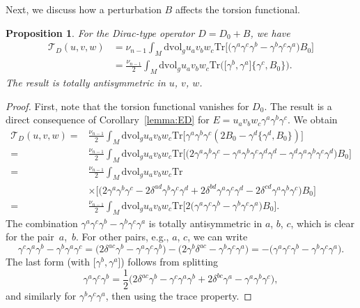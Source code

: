 \documentclass[10pt,a4paper]{amsart}
\numberwithin{equation}{section}
\newtheorem{Proposition}[Theorem]{Proposition}
\theoremstyle{definition}
\def\Tr{\mathrm{Tr}}
\def\dv{\mathrm{dvol}_g}
\begin{document}
Next, we discuss how a perturbation $B$ affects the torsion functional.
\begin{Proposition}\label{prop:ogolna_torsja}
	For the Dirac-type operator $D=D_0+B$, we have
	\begin{align*}
			\mathscr{T}_D(u,v,w)&=
			\nu_{n-1}\int_M \dv u_av_bw_c\Tr\bigl[\bigl(\gamma^a\gamma^c\gamma^b-\gamma^b\gamma^c\gamma^a\bigr)B_0\bigr]\\
			&=\frac{\nu_{n-1}}{2}\int_M \dv u_av_bw_c\Tr\bigl(\bigl[\gamma^b,\gamma^a\bigr]\{\gamma^c,B_0\}\bigr).
		\end{align*}
	The result is totally antisymmetric in $u$, $v$, $w$.
\end{Proposition}
\begin{proof}
	First, note that the torsion functional vanishes for $D_0$. The result is a direct consequence of Corollary~\ref{lemma:ED} for $E=u_av_bw_c\gamma^a\gamma^b\gamma^c$. We obtain
		\begin{align*}
			\mathscr{T}_D(u,v,w)={}&\frac{\nu_{n-1}}{2}\int_M \dv u_av_bw_c\Tr\bigl[\gamma^a\gamma^b\gamma^c(2B_0-\gamma^d\bigl\{\gamma^d,B_0\bigr\})\bigr]\\
			={}&\frac{\nu_{n-1}}{2}\int_M \dv u_av_bw_c\Tr\bigl[\bigl(2\gamma^a\gamma^b\gamma^c-\gamma^a\gamma^b\gamma^c\gamma^d\gamma^d-\gamma^d\gamma^a\gamma^b\gamma^c\gamma^d\bigr)B_0\bigr]\\
			={}&\frac{\nu_{n-1}}{2}\int_M \dv u_av_bw_c\Tr\\
&\times\bigl[\bigl(2\gamma^a\gamma^b\gamma^c-2\delta^{ad}\gamma^b\gamma^c\gamma^d+2\delta^{bd}\gamma^a\gamma^c\gamma^d-2\delta^{cd}\gamma^a\gamma^b\gamma^c\bigr)B_0\bigr]\\
			={}&\frac{\nu_{n-1}}{2}\int_M \dv u_av_bw_c\Tr\bigl[2\bigl(\gamma^a\gamma^c\gamma^b-\gamma^b\gamma^c\gamma^a\bigr)B_0\bigr].
		\end{align*}
	The combination $\gamma^a\gamma^c\gamma^b-\gamma^b\gamma^c\gamma^a$ is totally antisymmetric in $a$, $b$, $c$, which is clear for the pair~$a$,~$b$. For other pairs, e.g., $a$, $c$, we can write
	\[
		\gamma^c\gamma^a\gamma^b-\gamma^b\gamma^a\gamma^c
=\bigl(2\delta^{ac}\gamma^b-\gamma^a\gamma^c\gamma^b\bigr)-\bigl(2\gamma^b\delta^{ac}-\gamma^b\gamma^c\gamma^a\bigr)=-\bigl(\gamma^a\gamma^c\gamma^b-\gamma^b\gamma^c\gamma^a\bigr).
	\]
	The last form (with $\bigl[\gamma^b,\gamma^a\bigr]$) follows from splitting
	\[
		\gamma^a\gamma^c\gamma^b=\frac12\bigl(2\delta^{ac}\gamma^b-\gamma^c\gamma^a\gamma^b+2\delta^{bc}\gamma^a-\gamma^a\gamma^b\gamma^c\bigr),
	\]
	and similarly for $\gamma^b\gamma^c\gamma^a$, then using the trace property.
\end{proof}
\end{document}
